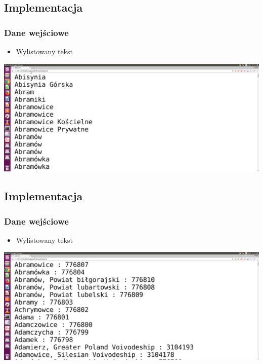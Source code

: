 \documentclass[slidestop,red]{beamer}
\begin{document}
\subsection{Implementacja}
\subsubsection{Dane wejściowe}
\frame
{
	\begin{block}{}
		\begin{itemize}
                    \item Wylistowany tekst
                \end{itemize}
                \includegraphics[scale=0.12]{dane-wejsciowe.png}
        \end{block}
}
\subsection{Implementacja}
\subsubsection{Dane wejściowe}
\frame
{
	\begin{block}{}
		\begin{itemize}
                    \item Wylistowany tekst
                \end{itemize}
                \includegraphics[scale=0.12]{dane-wyjsciowe.png}
        \end{block}
}
\end{document}
